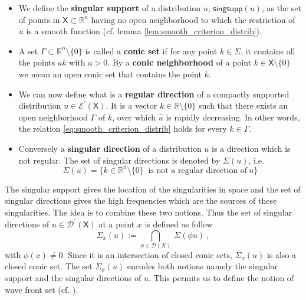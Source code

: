 \documentclass[11pt]{book}
\newcommand{\singsupp}{\mathsf{singsupp}}
\newcommand{\Dcal}{\mathcal{D}}
\newcommand{\Ecal}{\mathcal{E}}
\newcommand{\Rbb}{\mathbb{R}}
\newcommand{\Xsf}{\mathsf{X}}
\theoremstyle{break}
\begin{document}
\begin{itemize}
\setlength\itemsep{0pt}
%
%
%
%
\item We define the \textbf{singular support} of a distribution $u$, $\singsupp(u)$, as the set of points in $\Xsf \subset \Rbb^n$ having no open neighborhood to which the restriction of $u$ is a smooth function (cf. lemma \ref{lem:smooth_criterion_distrib}). 
%
%
%
%
\item A set $\Gamma \subset \Rbb^n \setminus \{0\}$ is called a \textbf{conic set} if for any point $k \in \Sigma$, it contains all the points $a k$ with $a > 0$. By a \textbf{conic neighborhood} of a point $k \in \Xsf \setminus \{0\}$ we mean an open conic set that contains the point $k$. 
%
%
%
%
\item We can now define what is a \textbf{regular direction} of a compactly supported distribution $u\in\Ecal^\prime(\Xsf)$. It is a vector $k \in \Rbb\setminus\{0\}$ such that there exists an open neighborhood $\Gamma$ of $k$, over which $\hat{u}$ is rapidly decreasing. In other words, the relation \eqref{eq:smooth_criterion_distrib} holds for every $k \in \Gamma$.\par%
%
\item
Conversely a \textbf{singular direction} of a distribution $u$ is a direction which is not regular. The set of singular directions is denoted by $\Sigma (u)$, i.e.
%
\begin{equation}
\Sigma(u) = \bigg\{ k \in \Rbb^n \setminus \{0\} \ \mbox{ is not a regular direction of} \ u  \bigg\} 
\label{eq:sing_direction}
\end{equation}
%
%
%
%
\end{itemize}


The singular support gives the location of the singularities in space and the set of singular directions gives the high frequencies which are the sources of these singularities. The idea is to combine these two notions. Thus the set of singular directions of $u\in\Dcal^\prime(\Xsf)$ at a point $x$ is defined as follow
%
\begin{equation*}
\Sigma_x(u) := \underset{\phi \in \Dcal(X)}{\bigcap} \ \Sigma(\phi u) \ , 
\end{equation*}
%
with $\phi(x) \neq 0$. Since it is an intersection of closed conic sets, $\Sigma_x(u)$ is also a closed conic set. The set $\Sigma_x(u)$ encodes both notions namely the singular support and the singular directions of $u$. This permits us to define the notion of wave front set (cf. \cite{hormander_analysis_1990}).
\end{document}
